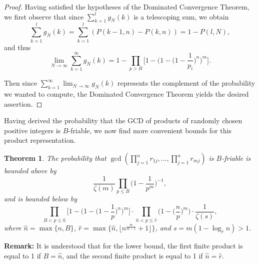 \documentclass[12pt]{amsart}
\newtheorem{theorem}{Theorem}[subsection]
\theoremstyle{definition}
\begin{document}
\begin{proof}
	Having satisfied the hypotheses of the Dominated Convergence Theorem, we first observe that since $\sum_{k=1}^l g_N(k)$ is a telescoping sum, we obtain
	$$\sum_{k=1}^l g_N(k) = \sum_{k=1}^l (P(k-1, n) - P(k, n)) = 1 - P(l, N),$$ 
	and thus
	$$\lim_{N \to \infty} \sum_{k=1}^{\infty} g_N(k) = 1 - \prod_{p > B} \Big[1 - \Big(1 - \Big(1 - \frac{1}{p_i}  \Big)^n\Big)^m\Big].$$
	
	\noindent Then since $\displaystyle \sum_{k=1}^{\infty} \lim_{N \to \infty} g_N(k)$ represents the complement of the probability we wanted to compute, the Dominated Convergence Theorem yields the desired assertion.
\end{proof}

Having derived the probability that the GCD of products of randomly chosen positive integers is $B$-friable, we now find more convenient bounds for this product representation.

\begin{theorem} The probability that $\gcd(\prod_{j=1}^n r_{1j}, ..., \prod_{j=1}^{n}r_{mj})$ is $B$-friable is bounded above by 
	$$\frac{1}{\zeta(m)}\prod_{p\leq B}\Big(1-\frac{1}{p^m}\Big)^{-1},$$
	and is bounded below by 
	$$\prod_{B<p\leq\hat{n}} \Big[1 - \Big(1 - \Big(1 - \frac{1}{p}\Big)^n \Big)^m\Big] \cdot \prod_{\hat{n}<p\leq\hat{r}} \Big(1 - \Big(\frac{n}{p}\Big)^m\Big) \cdot \frac{1}{\zeta(s)},$$
	where $\hat{n}=\max\{n,B\}$, $\hat{r}=\max\{\hat{n}, \lfloor n^{\frac{m}{m-1}}+1\rfloor\}$, and $s = m(1 - \log_{\hat{r}}{n}) > 1$.
\end{theorem} 

\noindent \textbf{Remark:} It is understood that for the lower bound, the first finite product is equal to 1 if $B = \hat{n}$, and the second finite product is equal to 1 if $\hat{n}=\hat{r}$.
\end{document}

